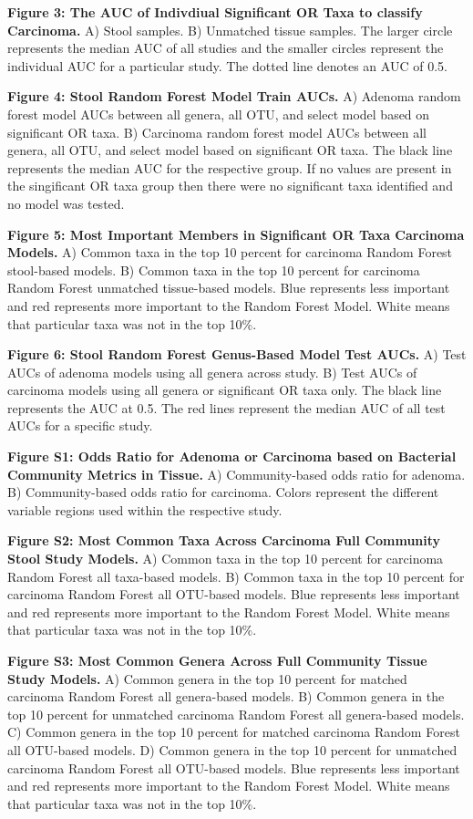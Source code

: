 \documentclass[12pt,]{article}
\begin{document}
\textbf{Figure 3: The AUC of Indivdiual Significant OR Taxa to classify
Carcinoma.} A) Stool samples. B) Unmatched tissue samples. The larger
circle represents the median AUC of all studies and the smaller circles
represent the individual AUC for a particular study. The dotted line
denotes an AUC of 0.5.

\textbf{Figure 4: Stool Random Forest Model Train AUCs.} A) Adenoma
random forest model AUCs between all genera, all OTU, and select model
based on significant OR taxa. B) Carcinoma random forest model AUCs
between all genera, all OTU, and select model based on significant OR
taxa. The black line represents the median AUC for the respective group.
If no values are present in the singificant OR taxa group then there
were no significant taxa identified and no model was tested.

\textbf{Figure 5: Most Important Members in Significant OR Taxa
Carcinoma Models.} A) Common taxa in the top 10 percent for carcinoma
Random Forest stool-based models. B) Common taxa in the top 10 percent
for carcinoma Random Forest unmatched tissue-based models. Blue
represents less important and red represents more important to the
Random Forest Model. White means that particular taxa was not in the top
10\%.

\textbf{Figure 6: Stool Random Forest Genus-Based Model Test AUCs.} A)
Test AUCs of adenoma models using all genera across study. B) Test AUCs
of carcinoma models using all genera or significant OR taxa only. The
black line represents the AUC at 0.5. The red lines represent the median
AUC of all test AUCs for a specific study.

\newpage

\textbf{Figure S1: Odds Ratio for Adenoma or Carcinoma based on
Bacterial Community Metrics in Tissue.} A) Community-based odds ratio
for adenoma. B) Community-based odds ratio for carcinoma. Colors
represent the different variable regions used within the respective
study.

\textbf{Figure S2: Most Common Taxa Across Carcinoma Full Community
Stool Study Models.} A) Common taxa in the top 10 percent for carcinoma
Random Forest all taxa-based models. B) Common taxa in the top 10
percent for carcinoma Random Forest all OTU-based models. Blue
represents less important and red represents more important to the
Random Forest Model. White means that particular taxa was not in the top
10\%.

\textbf{Figure S3: Most Common Genera Across Full Community Tissue Study
Models.} A) Common genera in the top 10 percent for matched carcinoma
Random Forest all genera-based models. B) Common genera in the top 10
percent for unmatched carcinoma Random Forest all genera-based models.
C) Common genera in the top 10 percent for matched carcinoma Random
Forest all OTU-based models. D) Common genera in the top 10 percent for
unmatched carcinoma Random Forest all OTU-based models. Blue represents
less important and red represents more important to the Random Forest
Model. White means that particular taxa was not in the top 10\%.
\end{document}
